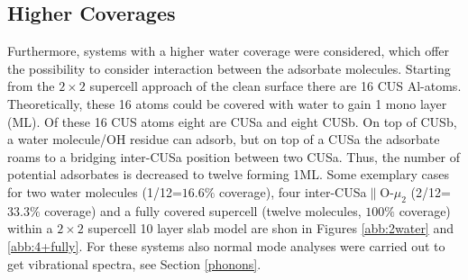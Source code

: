 \documentclass[11pt,DIV=13,BCOR=5mm,a4paper,headinclude]{scrbook}
\begin{document}
\subsection{Higher Coverages}\label{sec:high_cov-ads}

Furthermore, systems with a higher water coverage were considered, which offer the possibility to consider interaction between the adsorbate molecules.
Starting from the $2\times 2$ supercell approach of the clean surface there are 16 CUS Al-atoms.
Theoretically, these 16 atoms could be covered with water to gain 1 mono layer (ML).
Of these 16 CUS atoms eight are CUSa and eight CUSb.
On top of CUSb, a water molecule/OH residue can adsorb, but on top of a CUSa the adsorbate roams to a bridging inter-CUSa position between two CUSa.
Thus, the number of potential adsorbates is decreased to twelve forming 1ML.
Some exemplary cases for two water molecules (1/12=$16.6\%$ coverage), four inter-CUSa$\parallel$O-$\mu_2$ (2/12=$33.3\%$ coverage) and a fully covered supercell (twelve molecules, $100\%$ coverage) within a $2\times 2$ supercell 10 layer slab model are shon in Figures \ref{abb:2water} and \ref{abb:4+fully}.
For these systems also normal mode analyses were carried out to get vibrational spectra, see Section \ref{phonons}.
\end{document}
